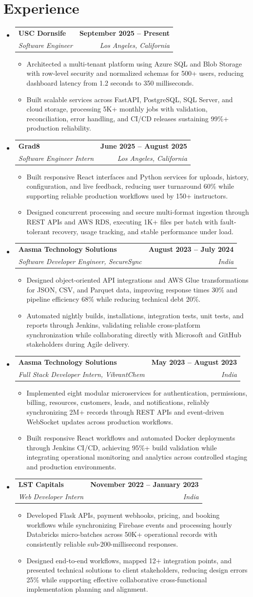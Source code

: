 \documentclass[letterpaper,10pt]{article}
\makeatletter
\newcommand{\itemTail}{\vspace{-4pt}}
\newcommand{\sectionGap}{\vspace{-8pt}}
\newcommand{\roleGap}{\vspace{2pt}}
\newcommand{\resumeItem}[1]{\item\small{{#1 \itemTail}}}
\newcommand{\resumeSubheading}[4]{\vspace{-1pt}\item\begin{tabular*}{1.0\textwidth}[t]{l@{\extracolsep{\fill}}r}\textbf{#1} & \textbf{\small #2} \\\textit{\small#3} & \textit{\small #4} \\\end{tabular*}\vspace{-2pt}}
\newcommand{\resumeSubHeadingListStart}{\begin{itemize}[leftmargin=0.0in, label={}]}
\newcommand{\resumeSubHeadingListEnd}{\end{itemize}}
\newcommand{\resumeItemListStart}{\begin{itemize}[leftmargin=0.15in,label=\textbullet,itemsep=3pt,topsep=0pt,parsep=0pt,partopsep=0pt]}
\newcommand{\resumeItemListEnd}{\end{itemize}\vspace{-4pt}}
\makeatother
\begin{document}
\section{Experience}
\resumeSubHeadingListStart
\resumeSubheading{USC Dornsife}{September 2025 -- Present}{Software Engineer}{Los Angeles, California}
\resumeItemListStart
\resumeItem{Architected a multi-tenant platform using Azure SQL and Blob Storage with row-level security and normalized schemas for 500+ users, reducing dashboard latency from 1.2 seconds to 350 milliseconds.}
\resumeItem{Built scalable services across FastAPI, PostgreSQL, SQL Server, and cloud storage, processing 5K+ monthly jobs with validation, reconciliation, error handling, and CI/CD releases sustaining 99\%+ production reliability.}
\resumeItemListEnd
\roleGap
\resumeSubheading{Grad8}{June 2025 -- August 2025}{Software Engineer Intern}{Los Angeles, California}
\resumeItemListStart
\resumeItem{Built responsive React interfaces and Python services for uploads, history, configuration, and live feedback, reducing user turnaround 60\% while supporting reliable production workflows used by 150+ instructors.}
\resumeItem{Designed concurrent processing and secure multi-format ingestion through REST APIs and AWS RDS, executing 1K+ files per batch with fault-tolerant recovery, usage tracking, and stable performance under load.}
\resumeItemListEnd
\roleGap
\resumeSubheading{Aasma Technology Solutions}{August 2023 -- July 2024}{Software Developer Engineer, SecureSync}{India}
\resumeItemListStart
\resumeItem{Designed object-oriented API integrations and AWS Glue transformations for JSON, CSV, and Parquet data, improving response times 30\% and pipeline efficiency 68\% while reducing technical debt 20\%.}
\resumeItem{Automated nightly builds, installations, integration tests, unit tests, and reports through Jenkins, validating reliable cross-platform synchronization while collaborating directly with Microsoft and GitHub stakeholders during Agile delivery.}
\resumeItemListEnd
\roleGap
\resumeSubheading{Aasma Technology Solutions}{May 2023 -- August 2023}{Full Stack Developer Intern, VibrantChem}{India}
\resumeItemListStart
\resumeItem{Implemented eight modular microservices for authentication, permissions, billing, resources, customers, leads, and notifications, reliably synchronizing 2M+ records through REST APIs and event-driven WebSocket updates across production workflows.}
\resumeItem{Built responsive React workflows and automated Docker deployments through Jenkins CI/CD, achieving 95\%+ build validation while integrating operational monitoring and analytics across controlled staging and production environments.}
\resumeItemListEnd
\roleGap
\resumeSubheading{LST Capitals}{November 2022 -- January 2023}{Web Developer Intern}{India}
\resumeItemListStart
\resumeItem{Developed Flask APIs, payment webhooks, pricing, and booking workflows while synchronizing Firebase events and processing hourly Databricks micro-batches across 50K+ operational records with consistently reliable sub-200-millisecond responses.}
\resumeItem{Designed end-to-end workflows, mapped 12+ integration points, and presented technical solutions to client stakeholders, reducing design errors 25\% while supporting effective collaborative cross-functional implementation planning and alignment.}
\resumeItemListEnd
\resumeSubHeadingListEnd
\sectionGap
\end{document}
